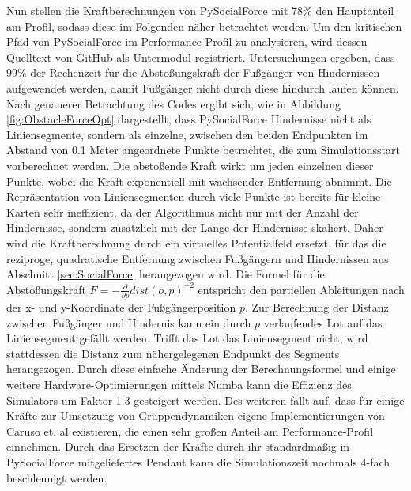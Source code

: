 Nun stellen die Kraftberechnungen von PySocialForce mit 78\% den Hauptanteil am Profil,
sodass diese im Folgenden näher betrachtet werden. Um den kritischen Pfad von PySocialForce
im Performance-Profil zu analysieren, wird dessen Quelltext von GitHub als Untermodul registriert.
Untersuchungen ergeben, dass 99\% der Rechenzeit für die Abstoßungskraft der Fußgänger von
Hindernissen aufgewendet werden, damit Fußgänger nicht durch diese hindurch laufen können.
Nach genauerer Betrachtung des Codes ergibt sich, wie in Abbildung \ref{fig:ObstacleForceOpt}
dargestellt, dass PySocialForce Hindernisse nicht als
Liniensegmente, sondern als einzelne, zwischen den beiden Endpunkten im Abstand von 0.1 Meter
angeordnete Punkte betrachtet, die zum Simulationsstart vorberechnet werden. Die abstoßende
Kraft wirkt um jeden einzelnen dieser Punkte, wobei die Kraft exponentiell mit wachsender
Entfernung abnimmt. Die Repräsentation von Liniensegmenten durch viele Punkte ist bereits
für kleine Karten sehr ineffizient, da der Algorithmus nicht nur mit der Anzahl der Hindernisse,
sondern zusätzlich mit der Länge der Hindernisse skaliert. Daher wird die Kraftberechnung
durch ein virtuelles Potentialfeld ersetzt, für das die reziproge, quadratische Entfernung
zwischen Fußgängern und Hindernissen aus Abschnitt \ref{sec:SocialForce} herangezogen wird.
Die Formel für die Abstoßungskraft $F = - \frac{\partial}{\partial p} dist(o, p)^{-2}$ entspricht
den partiellen Ableitungen nach der x- und y-Koordinate der Fußgängerposition $p$. Zur Berechnung
der Distanz zwischen Fußgänger und Hindernis kann ein durch $p$ verlaufendes Lot auf das
Liniensegment gefällt werden. Trifft das Lot das Liniensegment nicht, wird stattdessen
die Distanz zum nähergelegenen Endpunkt des Segments herangezogen. Durch diese einfache
Änderung der Berechnungsformel und einige weitere Hardware-Optimierungen mittels Numba
kann die Effizienz des Simulators um Faktor 1.3 gesteigert werden. Des weiteren fällt auf,
dass für einige Kräfte zur Umsetzung von Gruppendynamiken eigene Implementierungen von
Caruso et. al  existieren, die einen sehr großen Anteil am Performance-Profil einnehmen.
Durch das Ersetzen der Kräfte durch ihr standardmäßig in PySocialForce mitgeliefertes
Pendant kann die Simulationszeit nochmals 4-fach beschleunigt werden.\\

